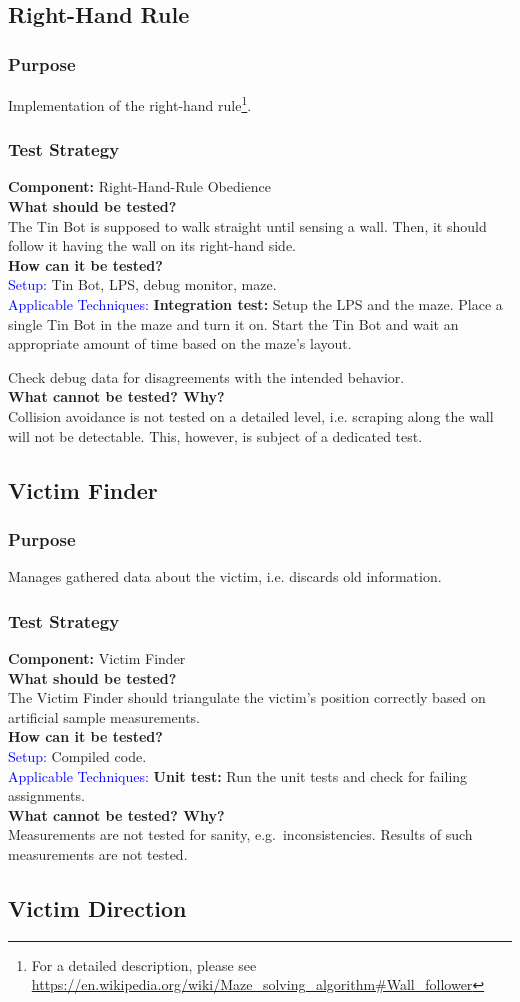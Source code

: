 \documentclass[a4paper,parskip,headheight=38pt]{scrartcl} %
\newcommand{\teststrat}[5]{
    \subsubsection{Test Strategy}
	\textbf{Component:} #1 \\
	\noindent\textbf{What should be tested?} \\
    \noindent #2 \\
	\noindent\textbf{How can it be tested?} \\
    \noindent\textcolor{blue}{Setup:} #3 \\
    \noindent\textcolor{blue}{Applicable Techniques:} #4 \\
	\noindent\textbf{What cannot be tested? Why?} \\
    \noindent #5
}
\newcommand{\BLACK}{\textbf{Integration test: }}
\newcommand{\WHITE}{\textbf{Unit test: }}
\begin{document}
\subsection{Right-Hand Rule}
\subsubsection{Purpose}
Implementation of the right-hand rule\footnote{For a detailed description,
please see 
\url{https://en.wikipedia.org/wiki/Maze_solving_algorithm\#Wall_follower}
}.
\teststrat{Right-Hand-Rule Obedience}{
    The Tin Bot is supposed to walk straight until sensing a wall. Then, it
    should follow it having the wall on its right-hand side.
}{
    Tin Bot, LPS, debug monitor, maze.
}{
    \BLACK Setup the LPS and the maze. Place a single Tin Bot in the maze and
    turn it
    on. Start the Tin Bot and wait an appropriate amount of time based on the
    maze's layout.

    Check debug data for disagreements with the intended behavior.
}{
    Collision avoidance is not tested on a detailed level, i.e. scraping along
    the wall will not be detectable. This, however, is subject of a dedicated
    test.
}
%
\subsection{Victim Finder}
\subsubsection{Purpose}
Manages gathered data about the victim, i.e. discards old information.

\teststrat{Victim Finder}{
    The Victim Finder should triangulate the victim's position correctly based
    on artificial sample measurements.
}{
    Compiled code.
}{
    \WHITE Run the unit tests and check for failing assignments. 
}{
    Measurements are not tested for sanity, e.g.\ inconsistencies. Results of
    such measurements are not tested.
}

\subsection{Victim Direction}
\end{document}
